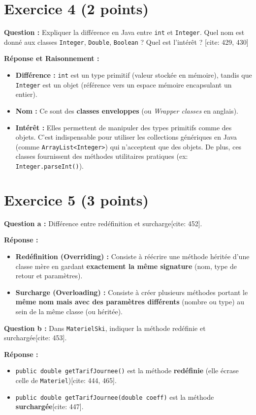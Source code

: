 \documentclass[11pt,a4paper]{article}
\begin{document}
\section*{Exercice 4 (2 points)}
\textbf{Question :} Expliquer la différence en Java entre \texttt{int} et \texttt{Integer}. Quel nom est donné aux classes \texttt{Integer}, \texttt{Double}, \texttt{Boolean} ? Quel est l'intérêt ? [cite: 429, 430]

\textbf{Réponse et Raisonnement :}
\begin{itemize}
    \item \textbf{Différence :} \texttt{int} est un type primitif (valeur stockée en mémoire), tandis que \texttt{Integer} est un objet (référence vers un espace mémoire encapsulant un entier).
    \item \textbf{Nom :} Ce sont des \textbf{classes enveloppes} (ou \textit{Wrapper classes} en anglais).
    \item \textbf{Intérêt :} Elles permettent de manipuler des types primitifs comme des objets. C'est indispensable pour utiliser les collections génériques en Java (comme \texttt{ArrayList<Integer>}) qui n'acceptent que des objets. De plus, ces classes fournissent des méthodes utilitaires pratiques (ex: \texttt{Integer.parseInt()}).
\end{itemize}

\section*{Exercice 5 (3 points)}
\textbf{Question a :} Différence entre redéfinition et surcharge[cite: 452].

\textbf{Réponse :}
\begin{itemize}
    \item \textbf{Redéfinition (Overriding) :} Consiste à réécrire une méthode héritée d'une classe mère en gardant \textbf{exactement la même signature} (nom, type de retour et paramètres).
    \item \textbf{Surcharge (Overloading) :} Consiste à créer plusieurs méthodes portant le \textbf{même nom mais avec des paramètres différents} (nombre ou type) au sein de la même classe (ou héritée).
\end{itemize}

\textbf{Question b :} Dans \texttt{MaterielSki}, indiquer la méthode redéfinie et surchargée[cite: 453].

\textbf{Réponse :}
\begin{itemize}
    \item \texttt{public double getTarifJournee()} est la méthode \textbf{redéfinie} (elle écrase celle de \texttt{Materiel})[cite: 444, 465].
    \item \texttt{public double getTarifJournee(double coeff)} est la méthode \textbf{surchargée}[cite: 447].
\end{itemize}
\end{document}
